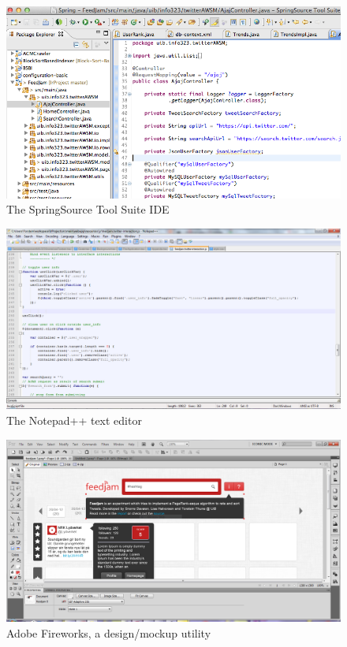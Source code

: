 \begin{figure}[ht]
    \begin{minipage}[b]{1\linewidth}
        \centering
        \includegraphics[width=1\textwidth]{figures/springsourcetoolsuite}
        \caption{The SpringSource Tool Suite IDE}
        \label{fig:springsourcetoolsuite}
    \end{minipage}
\end{figure}

\begin{figure}[ht]
    \begin{minipage}[b]{1\linewidth}
        \centering
        \includegraphics[width=1\textwidth]{figures/notepadplusplus}
        \caption{The Notepad++ text editor}
        \label{fig:notepadplusplus}
    \end{minipage}
\end{figure}

\begin{figure}[ht]
    \begin{minipage}[b]{1\linewidth}
        \centering
        \includegraphics[width=1\textwidth]{figures/fireworks}
        \caption{Adobe Fireworks, a design/mockup utility}
        \label{fig:fireworks}
    \end{minipage}
\end{figure}